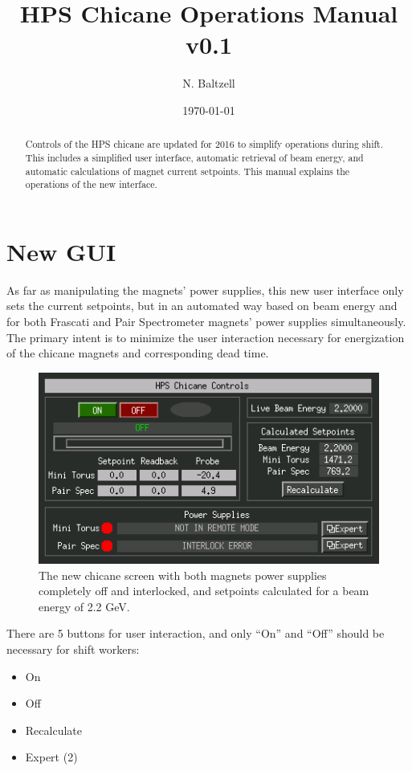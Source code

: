 \documentclass[amsmath,amssymb,notitlepage,12pt]{revtex4-1}
\begin{document}

\title{HPS Chicane Operations Manual v0.1}
\author{N. Baltzell}
\date{\today}
\begin{abstract}
Controls of the HPS chicane are updated for 2016 to simplify operations during shift.  This includes a simplified user interface, automatic retrieval of beam energy, and automatic calculations of magnet current setpoints.  This manual explains the operations of the new interface. 
\end{abstract}
\maketitle

\section{New GUI}

As far as manipulating the magnets' power supplies, this new user interface only sets the current setpoints, but in an automated way based on beam energy and for both Frascati and Pair Spectrometer magnets' power supplies simultaneously.  The primary intent is to minimize the user interaction necessary for energization of the chicane magnets and corresponding dead time.

\begin{figure}[htbp]\centering
    \includegraphics[width=14cm]{pics/gui}
    \caption{The new chicane screen with both magnets power supplies completely off and interlocked, and setpoints calculated for a beam energy of 2.2 GeV.\label{fig:guiChicaneOff}}
\end{figure}

There are 5 buttons for user interaction, and only ``On'' and ``Off'' should be necessary for shift workers:
\begin{itemize}
    \item On
    \item Off
    \item Recalculate
    \item Expert (2)
\end{itemize}
\end{document}
